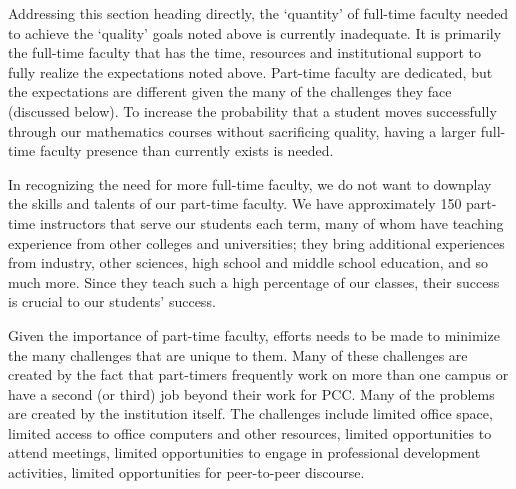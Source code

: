 Addressing this section heading directly, the `quantity' of full-time faculty
needed to achieve the `quality' goals noted above is currently inadequate.  It
is primarily the full-time faculty that has the time, resources and
institutional support to fully realize the expectations noted above.  Part-time
faculty are dedicated, but the expectations are different given the
many of the challenges they face (discussed below).   To increase the probability that a student moves successfully
through our mathematics courses without sacrificing quality, having a larger
full-time faculty presence than currently exists is needed.

In recognizing the need for more full-time faculty, we do not want to downplay
the skills and talents of our part-time faculty.  We have approximately 150
part-time instructors that serve our students each term, many of whom have
teaching experience from other colleges and universities; they bring additional
experiences from industry, other sciences, high school and middle school
education, and so much more.  Since they teach such a high percentage of our
classes, their success is crucial to our students' success.

Given the importance of part-time faculty, efforts needs to be made to minimize
the many challenges that are unique to them.  Many of these challenges are
created by the fact that part-timers frequently work on more than one campus or
have a second (or third) job beyond their work for PCC.  Many of the problems
are created by the institution itself.  The challenges include limited office
space, limited access to office computers and other resources, limited
opportunities to attend meetings, limited opportunities to engage in
professional development activities, limited opportunities for peer-to-peer
discourse.



